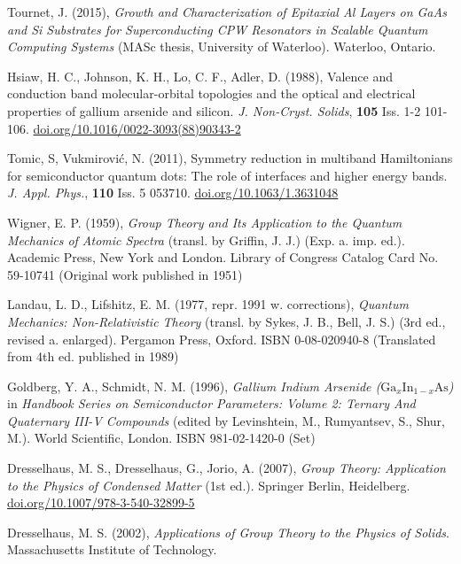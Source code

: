 \documentclass[12pt]{article}
\begin{document}
\begin{thebibliography}{10}
Tournet, J. (2015), \textit{Growth and Characterization of Epitaxial Al Layers on GaAs and Si Substrates for Superconducting CPW Resonators in Scalable Quantum Computing Systems} (MASc thesis, University of Waterloo). Waterloo, Ontario.

Hsiaw, H. C., Johnson, K. H., Lo, C. F., Adler, D. (1988), Valence and conduction band molecular-orbital topologies and the optical and electrical properties of gallium arsenide and silicon. \textit{J. Non-Cryst. Solids}, \textbf{105} Iss. 1-2 101-106. \href{https://doi.org/10.1016/0022-3093(88)90343-2}{doi.org/10.1016/0022-3093(88)90343-2}

Tomic, S, Vukmirović, N. (2011), Symmetry reduction in multiband Hamiltonians for semiconductor quantum dots: The role of interfaces and higher energy bands. \textit{J. Appl. Phys.}, \textbf{110} Iss. 5 053710. \href{https://doi.org/10.1063/1.3631048}{doi.org/10.1063/1.3631048}

Wigner, E. P. (1959), \textit{Group Theory and Its Application to the Quantum Mechanics of Atomic Spectra} (transl. by Griffin, J. J.) (Exp. a. imp. ed.). Academic Press, New York and London. Library of Congress Catalog Card No. 59-10741 (Original work published in 1951)

Landau, L. D., Lifshitz, E. M. (1977, repr. 1991 w. corrections), \textit{Quantum Mechanics: Non-Relativistic Theory} (transl. by Sykes, J. B., Bell, J. S.) (3rd ed., revised a. enlarged). Pergamon Press, Oxford. ISBN 0-08-020940-8 (Translated from 4th ed. published in 1989)

Goldberg, Y. A., Schmidt, N. M. (1996), \textit{Gallium Indium Arsenide ($\text{Ga}_{x}\text{In}_{1-x}\text{As}$)} in \textit{Handbook Series on Semiconductor Parameters: Volume 2: Ternary And Quaternary III-V Compounds} (edited by Levinshtein, M., Rumyantsev, S., Shur, M.). World Scientific, London. ISBN  981-02-1420-0 (Set)

Dresselhaus, M. S., Dresselhaus, G., Jorio, A. (2007), \textit{Group Theory: Application to the Physics of Condensed Matter} (1st ed.). Springer Berlin, Heidelberg. \href{https://doi.org/10.1007/978-3-540-32899-5}{doi.org/10.1007/978-3-540-32899-5}

Dresselhaus, M. S. (2002), \textit{Applications of Group Theory to the Physics of Solids}. Massachusetts Institute of Technology.


\end{thebibliography}
\end{document}
